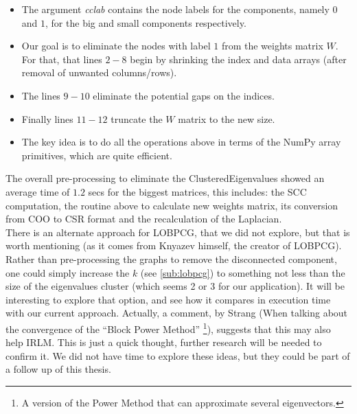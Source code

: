 \begin{itemize}
  \item The argument \emph{cclab} contains the node labels for the
    components, namely $0$ and $1$, for the big and small components
    respectively. \\
  \item  Our goal is to eliminate the nodes with label $1$ from the
    weights matrix $W$. For that, that lines $2-8$ begin by shrinking
    the index and data arrays (after removal of unwanted
    columns/rows). \\
  \item The lines $9-10$ eliminate the potential gaps on the
    indices. \\
  \item Finally lines $11-12$ truncate the $W$ matrix to the new
    size. \\
  \item The key idea is to do all the operations above in terms of the
    NumPy \cite{numpy} array primitives, which are quite efficient. \\
\end{itemize}

The overall pre-processing to eliminate the \gls{ClusteredEigenvalues} 
showed an average time of $1.2$ secs for the biggest
matrices, this includes: the \gls{SCC} computation, the routine above
to calculate new weights matrix, its conversion from COO
to CSR format and the recalculation of the \gls{Laplacian}. \\

There is an alternate approach for \gls{LOBPCG}, that we did not
explore, but that is worth mentioning (as it comes from Knyazev 
himself, the creator of \gls{LOBPCG}). Rather than pre-processing the
graphs to remove the disconnected component, one could simply
increase the $k$ (see \cref{sub:lobpcg}) to something not less than
the size of the eigenvalues cluster (which  
seems 2 or 3 for our application). It will be interesting to 
explore that option, and see how it compares in execution time
with our current approach. Actually, a comment, by Strang 
\cite{strang88} (When talking about the convergence of the ``Block
Power Method'' \footnote{A version of the Power Method that can
  approximate several eigenvectors.}), suggests that this may
also help \gls{IRLM}. This is 
just a quick thought, further research will be needed to confirm
it. We did not have time to explore these ideas, but they could be part of
a follow up of this thesis.

